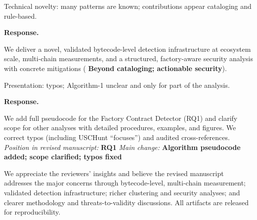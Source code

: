 \documentclass[acmsmall]{acmart}
\begin{document}
	\begin{tcolorbox}
		[commentbox,title=Reviewer \#4 -- Comment 4] Technical novelty: many patterns are known; contributions
		appear cataloging and rule-based.
	\end{tcolorbox}

	\noindent
	\textbf{Response.}

	We deliver a novel, validated bytecode-level detection infrastructure at ecosystem scale, multi-chain
	measurements, and a structured, factory-aware security analysis with concrete mitigations (
	{\textbf{Beyond cataloging; actionable security}}).

	\begin{tcolorbox}
		[commentbox,title=Reviewer \#4 -- Comment 5] Presentation: typos; Algorithm-1 unclear and only
		for part of the analysis.
	\end{tcolorbox}

	\noindent
	\textbf{Response.}

	We add full pseudocode for the Factory Contract Detector (RQ1) and clarify scope for other
analyses with detailed procedures, examples, and figures. We correct typos (including USCHunt
“focuses”) and audited cross-references.
\noindent\textit{Position in revised manuscript:} {\color{red}\textbf{RQ1}}
\noindent\textit{Main change:} {\color{blue}\textbf{Algorithm pseudocode added; scope clarified; typos fixed}}

	\vspace{1em}
	\noindent
	We appreciate the reviewers’ insights and believe the revised manuscript addresses the major
	concerns through bytecode-level, multi-chain measurement; validated detection infrastructure; richer
	clustering and security analyses; and clearer methodology and threats-to-validity discussions. All
	artifacts are released for reproducibility.
\end{document}
